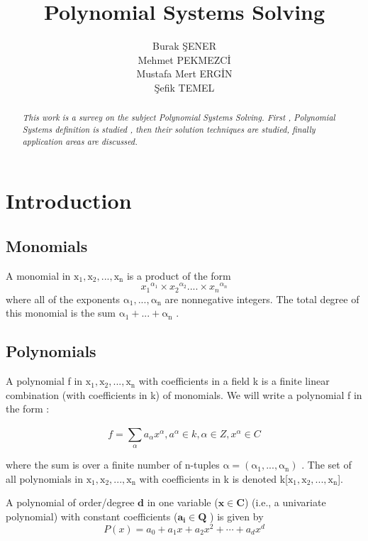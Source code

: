 \documentclass[11pt]{article}
\title{\textbf{Polynomial Systems Solving}}
\author{Burak ŞENER\\
        Mehmet PEKMEZCİ\\
		Mustafa Mert ERGİN\\
		Şefik TEMEL
		}
\date{}
\begin{document}
\maketitle
\begin{abstract}
\emph{This work is a survey on the subject Polynomial Systems Solving. First , Polynomial Systems definition is studied , then their solution techniques are studied, finally application areas are discussed. }
\end{abstract}

\section{Introduction}

\subsection{Monomials}
A monomial in $\mathrm{x_1, x_2, ...,x_n}$ is a product of the form
\begin{equation}
    {x_1}^{\alpha_1} \times {x_2}^{\alpha_2} .... \times {x_n}^{\alpha_n}
\end{equation}
where all of the exponents $\mathrm{\alpha_1,...,\alpha_n }$ are nonnegative integers. The total degree of this monomial is the sum $\mathrm{\alpha_1+...+\alpha_n }$ .

\subsection{Polynomials}
A polynomial f in $\mathrm{x_1, x_2, ...,x_n}$ with coefficients in a field k is a finite linear combination (with coefficients in k) of monomials. We will write a polynomial f in the form :\cite{coxLittleOshea}

\begin{equation}
   f =  \sum_{\alpha}^{}{a_{\alpha}{x}^{\alpha} }, a^{\alpha} \in k, \alpha \in Z, {x}^{\alpha} \in C
\end{equation}


where the sum is over a finite number of n-tuples $\mathrm{\alpha=(\alpha_1,...,\alpha_n) }$ . The set of all polynomials in $\mathrm{x_1, x_2, ...,x_n}$ with coefficients in k is denoted k[$\mathrm{x_1, x_2, ...,x_n}$].

 A polynomial of order/degree $\mathbf{d}$  in one variable ($\mathbf{x \in C}$) (i.e., a univariate polynomial) with constant coefficients ($\mathbf{a_i \in Q}$ ) is given by \cite{wolframPolynomial}
\begin{equation}
    P(x)=a_{0}+a_{1}x+a_{2}{x}^2+\cdots+a_{d}{x}^d
\end{equation}
\end{document}
